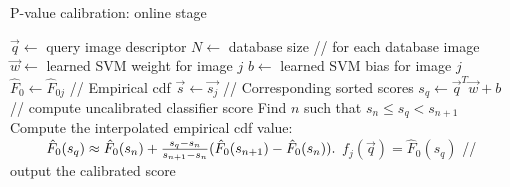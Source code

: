 %
      \begin{algorithm}
          \caption{P-value calibration: online stage}
          \label{alg:online}
          \begin{algorithmic}[1]
                \State $\vec{q} \gets$ query image descriptor
                \State $N \gets$ database size
                 // for each database image
                  \State $\vec{w} \gets$ learned SVM weight for image $j$
                  \State $b \gets$ learned SVM bias for image $j$
                  \State $\hat{F}_{0} \gets \hat{F}_{0j}$ // Empirical cdf
                  \State $\vec{s} \gets \vec{s_j}$ // Corresponding sorted scores
                  \State $s_q \gets \vec{q}^T\vec{w}+b$  // compute uncalibrated classifier score 
                  \State Find $n$ such that $s_{n} \leq s_q < s_{n+1} $
                  \State Compute the interpolated empirical cdf value:
                  \Statex $\hspace{9mm}
                    \hat{F}_0(s_q)\approx 
                    \hat{F}_0(s_n)+\frac{s_q-s_n}{s_{n+1}-s_n} (\hat{F}_0(s_{n+1})-\hat{F}_0(s_n)).
                  $
                  \State $f_j(\vec{q})=\hat{F}_0(s_q)$ // output the calibrated score

                \EndFor
                \EndProcedure
          \end{algorithmic}
      \end{algorithm}
      

